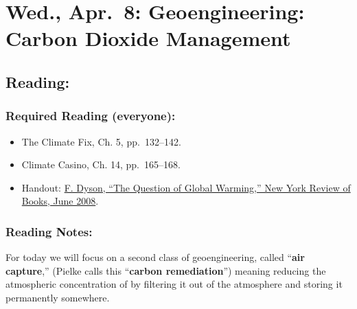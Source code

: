 \documentclass[
]{article}
\providecommand{\tightlist}{%
  \setlength{\itemsep}{0pt}\setlength{\parskip}{0pt}}
\newcommand{\COO}{\ce{CO2}}
\begin{document}
\hypertarget{wed.-apr.-8-geoengineering-carbon-dioxide-management}{%
\section{Wed., Apr.~8: Geoengineering: Carbon Dioxide
Management}\label{wed.-apr.-8-geoengineering-carbon-dioxide-management}}

\hypertarget{reading-36}{%
\subsection{Reading:}\label{reading-36}}

\hypertarget{required-reading-everyone-31}{%
\subsubsection{Required Reading
(everyone):}\label{required-reading-everyone-31}}

\begin{itemize}
\tightlist
\item
  The Climate Fix, Ch. 5, pp.~132--142.
\item
  Climate Casino, Ch. 14, pp.~165--168.
\item
  Handout:
  \href{/files/reading_handouts/Dyson-GlobalWarming-2008.pdf}{F. Dyson,
  ``The Question of Global Warming,'' New York Review of Books, June
  2008}.
\end{itemize}

\hypertarget{reading-notes-28}{%
\subsubsection{Reading Notes:}\label{reading-notes-28}}

For today we will focus on a second class of geoengineering, called
``\textbf{air capture},'' (Pielke calls this ``\textbf{carbon
remediation}'') meaning reducing the atmospheric concentration of
\COO by filtering it out of the atmosphere and storing it permanently
somewhere.
\end{document}

